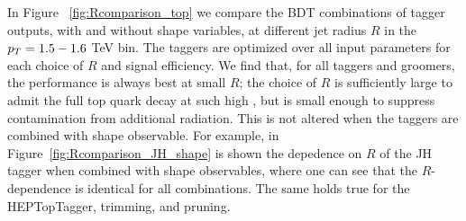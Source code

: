 %

In Figure ~\ref{fig:Rcomparison_top} we compare the BDT combinations of tagger outputs, with and without shape variables, at different jet radius $R$ in the $p_T=1.5-1.6$ TeV bin. The taggers are optimized over all input parameters for each choice of $R$ and signal efficiency. We find that, for all taggers and groomers, the performance is always best at small $R$; the choice of $R$ is sufficiently large to admit the full top quark decay at such high \pt, but is small enough to suppress contamination from additional radiation. This is not altered when the taggers are combined with shape observable. For example, in Figure~\ref{fig:Rcomparison_JH_shape} is shown the depedence on $R$ of the JH tagger when combined with shape observables, where one can see that the $R$-dependence is identical for all combinations. The same holds true for the HEPTopTagger, trimming, and pruning.

